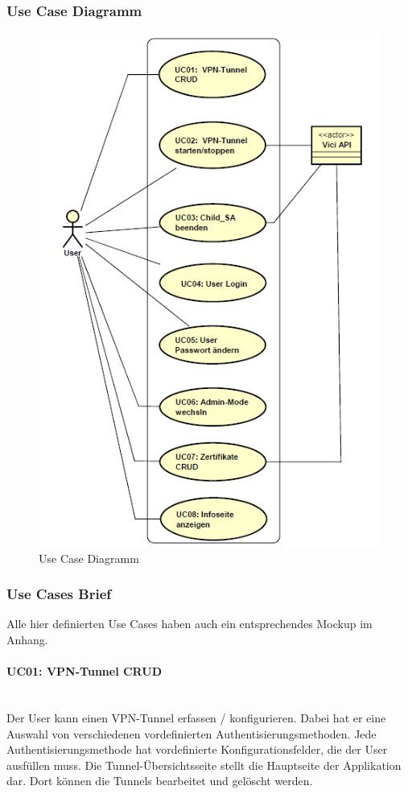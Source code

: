 \subsubsection{Use Case Diagramm}
\begin{figure}[H]
\centering
\includegraphics[width=350pt]{images/strongMan_usecase.png}
\caption[Use Case Diagramm]{Use Case Diagramm}
\end{figure}


\subsubsection{Use Cases Brief}
Alle hier definierten Use Cases haben auch ein entsprechendes Mockup im Anhang.
\paragraph{UC01: VPN-Tunnel CRUD}\mbox{} \\
Der User kann einen VPN-Tunnel erfassen / konfigurieren. Dabei hat er eine Auswahl von verschiedenen vordefinierten Authentisierungsmethoden. Jede Authentisierungsmethode hat vordefinierte Konfigurationsfelder, die der User ausfüllen muss. Die Tunnel-Übersichtsseite stellt die Hauptseite der Applikation dar. Dort können die Tunnels bearbeitet und gelöscht werden.

